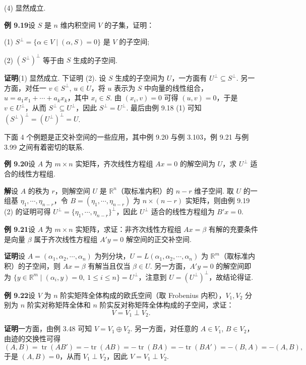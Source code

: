\documentclass[UTF8,12pt,a4paper,fontset=fandol]{ctexart}
\begin{document}
(4) 显然成立.

\noindent\textbf{例 9.19}\quad 设 $S$ 是 $n$ 维内积空间 $V$ 的子集，证明：

(1) $S^\perp=\{\alpha\in V\mid (\alpha,S)=0\}$ 是 $V$ 的子空间;

(2) $(S^\perp)^\perp$ 等于由 $S$ 生成的子空间.

\noindent\textbf{证明}\quad (1) 显然成立. 下证明 (2). 设 $S$ 生成的子空间为 $U$，一方面有 $U^\perp\subseteq S^\perp$. 另一方面，对任一 $v\in S^\perp$, $u\in U$，将 $u$ 表示为 $S$ 中向量的线性组合，$u=a_1x_1+\cdots+a_kx_k$，其中 $x_i\in S$. 由 $(x_i,v)=0$ 可得 $(u,v)=0$，于是 $v\in U^\perp$，从而 $S^\perp\subseteq U^\perp$，因此 $S^\perp=U^\perp$. 最后由例 9.18 (1) 可知 $(S^\perp)^\perp=(U^\perp)^\perp=U$.

下面 4 个例题是正交补空间的一些应用，其中例 9.20 与例 3.103，例 9.21 与例 3.99 之间有着密切的联系.

\noindent\textbf{例 9.20}\quad 设 $A$ 为 $m\times n$ 实矩阵，齐次线性方程组 $Ax=0$ 的解空间为 $U$，求 $U^\perp$ 适合的线性方程组.

\noindent\textbf{解}\quad 设 $A$ 的秩为 $r$，则解空间 $U$ 是 $\mathbb{R}^n$（取标准内积）的 $n-r$ 维子空间. 取 $U$ 的一组基 $\eta_1,\cdots,\eta_{n-r}$，令 $B=(\eta_1,\cdots,\eta_{n-r})$ 为 $n\times(n-r)$ 实矩阵，则由例 9.19 (2) 的证明可得 $U^\perp=\{\eta_1,\cdots,\eta_{n-r}\}^\perp$，因此 $U^\perp$ 适合的线性方程组为 $B'x=0$.

\noindent\textbf{例 9.21}\quad 设 $A$ 为 $m\times n$ 实矩阵，求证：非齐次线性方程组 $Ax=\beta$ 有解的充要条件是向量 $\beta$ 属于齐次线性方程组 $A'y=0$ 解空间的正交补空间.

\noindent\textbf{证明}\quad 设 $A=(\alpha_1,\alpha_2,\cdots,\alpha_n)$ 为列分块，$U=L(\alpha_1,\alpha_2,\cdots,\alpha_n)$ 为 $\mathbb{R}^m$（取标准内积）的子空间，则 $Ax=\beta$ 有解当且仅当 $\beta\in U$. 另一方面，$A'y=0$ 的解空间即为 $\{y\in\mathbb{R}^m\mid (\alpha_i,y)=0,\ 1\le i\le n\}=U^\perp$，注意到 $U=(U^\perp)^\perp$，故结论得证.

\noindent\textbf{例 9.22}\quad 设 $V$ 为 $n$ 阶实矩阵全体构成的欧氏空间（取 Frobenius 内积），$V_1,V_2$ 分别为 $n$ 阶实对称矩阵全体和 $n$ 阶实反对称矩阵全体构成的子空间，求证：
\[
V=V_1\perp V_2.
\]

\noindent\textbf{证明}\quad 一方面，由例 3.48 可知 $V=V_1\oplus V_2$. 另一方面，对任意的 $A\in V_1$, $B\in V_2$，由迹的交换性可得
\[
(A,B)=\operatorname{tr}(AB')=-\operatorname{tr}(AB)=-\operatorname{tr}(BA)=-\operatorname{tr}(BA')=-(B,A)=-(A,B),
\]
于是 $(A,B)=0$，从而 $V_1\perp V_2$，因此 $V=V_1\perp V_2$.
\end{document}
